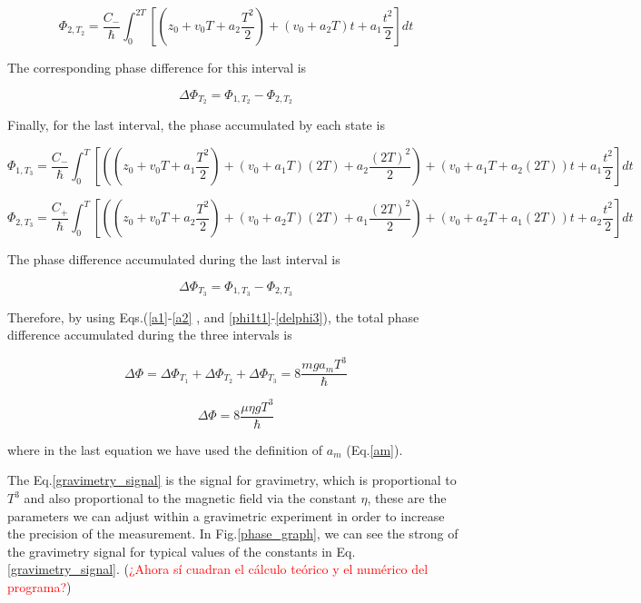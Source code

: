 \documentclass{article}
\begin{document}
\begin{equation}
\Phi_{2, T_{2}} = \frac{C_{-}}{\hbar} \int_{0}^{2T} [(z_{0}+v_{0}T+a_{2} \frac{T^{2}}{2}) + (v_{0}+a_{2}T)t + a_{1} \frac{t^{2}}{2}]dt
\end{equation}

The corresponding phase difference for this interval is

\begin{equation}
\Delta \Phi_{T_{2}} = \Phi_{1, T_{2}} - \Phi_{2, T_{2}}
\end{equation}

Finally, for the last interval, the phase accumulated by each state is

\begin{equation}
\Phi_{1, T_{3}} = \frac{C_{-}}{\hbar} \int_{0}^{T} [((z_{0}+v_{0}T+a_{1} \frac{T^{2}}{2}) + (v_{0}+a_{1}T)(2T) + a_{2} \frac{(2T)^{2}}{2}) + (v_{0}+a_{1}T + a_{2}(2T))t + a_{1} \frac{t^{2}}{2}]dt
\end{equation}

\begin{equation}
\Phi_{2, T_{3}} = \frac{C_{+}}{\hbar} \int_{0}^{T} [((z_{0}+v_{0}T+a_{2} \frac{T^{2}}{2}) + (v_{0}+a_{2}T)(2T) + a_{1} \frac{(2T)^{2}}{2}) + (v_{0}+a_{2}T + a_{1}(2T))t + a_{2} \frac{t^{2}}{2}]dt
\end{equation}

The phase difference accumulated during the last interval is

\begin{equation}\label{delphi3}
\Delta \Phi_{T_{3}} = \Phi_{1, T_{3}} - \Phi_{2, T_{3}}
\end{equation}

Therefore, by using Eqs.(\ref{a1}-\ref{a2} , and \ref{phi1t1}-\ref{delphi3}), the total phase difference accumulated during the three intervals is

\begin{equation}
\Delta \Phi = \Delta \Phi_{T_{1}} + \Delta \Phi_{T_{2}} + \Delta \Phi_{T_{3}} = 8 \frac{mga_{m}T^3}{\hbar}
\end{equation}

\begin{equation}\label{gravimetry_signal}
\Delta \Phi = 8 \frac{\mu \eta g T^3}{\hbar}
\end{equation}

where in the last equation we have used the definition of $a_m$ (Eq.\ref{am}). 

The Eq.\ref{gravimetry_signal} is the signal for gravimetry, which is proportional to $T^3$ and also proportional to the magnetic field via the constant $\eta$, these are the parameters we can adjust within a gravimetric experiment in order to increase the precision of the measurement. In Fig.\ref{phase_graph}, we can see the strong of the gravimetry signal for typical values of the constants in Eq.\ref{gravimetry_signal}. (\textcolor{red}{¿Ahora sí cuadran el cálculo teórico y el numérico del programa?})
\end{document}
